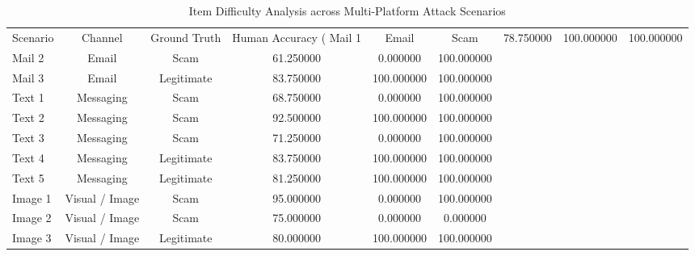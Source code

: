 \begin{table}
\caption{Item Difficulty Analysis across Multi-Platform Attack Scenarios}
\label{tab:item_difficulty}
\begin{tabular}{lcc|ccc}
\toprule
Scenario & Channel & Ground Truth & Human Accuracy (%
\midrule
Mail 1 & Email & Scam & 78.750000 & 100.000000 & 100.000000 \\
Mail 2 & Email & Scam & 61.250000 & 0.000000 & 100.000000 \\
Mail 3 & Email & Legitimate & 83.750000 & 100.000000 & 100.000000 \\
Text 1 & Messaging & Scam & 68.750000 & 0.000000 & 100.000000 \\
Text 2 & Messaging & Scam & 92.500000 & 100.000000 & 100.000000 \\
Text 3 & Messaging & Scam & 71.250000 & 0.000000 & 100.000000 \\
Text 4 & Messaging & Legitimate & 83.750000 & 100.000000 & 100.000000 \\
Text 5 & Messaging & Legitimate & 81.250000 & 100.000000 & 100.000000 \\
Image 1 & Visual / Image & Scam & 95.000000 & 0.000000 & 100.000000 \\
Image 2 & Visual / Image & Scam & 75.000000 & 0.000000 & 0.000000 \\
Image 3 & Visual / Image & Legitimate & 80.000000 & 100.000000 & 100.000000 \\
\bottomrule
\end{tabular}
\end{table}
